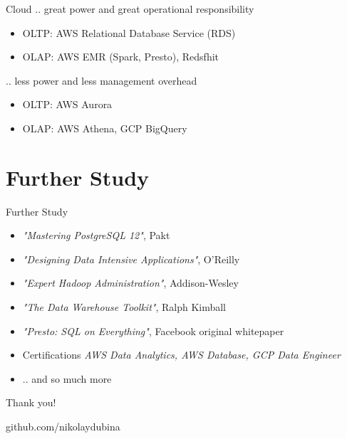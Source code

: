 \documentclass[t,pdf]{beamer}
\begin{document}
\begin{frame}{Cloud}
.. great power and great operational responsibility
\begin{itemize}
    \item OLTP: AWS Relational Database Service (RDS)
    \item OLAP: AWS EMR (Spark, Presto), Redsfhit
\end{itemize}

.. less power and less management overhead
\begin{itemize}
    \item OLTP: AWS Aurora
    \item OLAP: AWS Athena, GCP BigQuery
\end{itemize}
\end{frame}

\section{Further Study}

\begin{frame}{Further Study}
\begin{itemize}
    \item \textit{"Mastering PostgreSQL 12"}, Pakt
    \item \textit{"Designing Data Intensive Applications"}, O'Reilly
    \item \textit{"Expert Hadoop Administration"}, Addison-Wesley
    \item \textit{"The Data Warehouse Toolkit"}, Ralph Kimball 
    \item \textit{"Presto: SQL on Everything"}, Facebook original whitepaper
    \item Certifications \textit{AWS Data Analytics, AWS Database, GCP Data Engineer}
    \item .. and so much more
\end{itemize}
\end{frame}

\begin{frame}{Thank you!}
\begin{center}
github.com/nikolaydubina
\end{center}
\end{frame}
\end{document}
